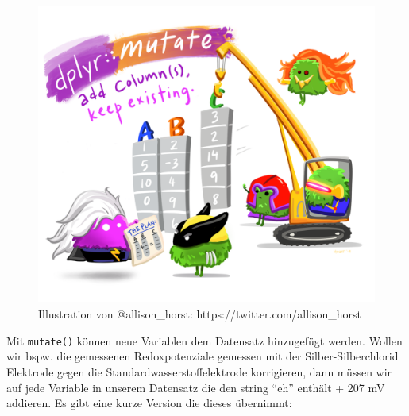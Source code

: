 \documentclass[
]{article}
\begin{document}
\begin{figure}

{\centering \includegraphics[width=62.24in]{images/040} 

}

\caption{Illustration von @allison_horst: https://twitter.com/allison_horst}\label{fig:unnamed-chunk-131}
\end{figure}

Mit \texttt{mutate()} können neue Variablen dem Datensatz hinzugefügt werden. Wollen wir bspw. die gemessenen Redoxpotenziale gemessen mit der Silber-Silberchlorid Elektrode gegen die Standardwasserstoffelektrode korrigieren, dann müssen wir auf jede Variable in unserem Datensatz die den string ``eh'' enthält + 207 mV addieren. Es gibt eine kurze Version die dieses übernimmt:
\end{document}
